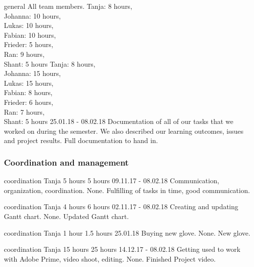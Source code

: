 	{general}%
	{All team members.}%
	{Tanja: 8 hours, \\
	Johanna: 10 hours,\\
	Lukas: 10 hours,\\
	Fabian: 10 hours,\\
	Frieder: 5 hours,\\
	Ran: 9 hours,\\
	Shant: 5 hours}%
	{Tanja: 8 hours,\\ 
	Johanna: 15 hours,\\
	Lukas: 15 hours,\\
	Fabian: 8 hours,\\
	Frieder: 6 hours,\\
	Ran: 7 hours,\\
	Shant: 5 hours}%
	{25.01.18 - 08.02.18}%
	{Documentation of all of our tasks that we worked on during the semester. We also described our learning outcomes, issues and project results.}%
	{}%
	{Full documentation to hand in.}%

\subsubsection{Coordination and management}
	{coordination}%
	{Tanja}%
	{5 hours}%
	{5 hours}%
	{09.11.17 - 08.02.18}%
	{Communication, organization, coordination.}%
	{None.}%
	{Fulfilling of tasks in time, good communication.}%


	{coordination}%
	{Tanja}%
	{4 hours}%
	{6 hours}%
	{02.11.17 - 08.02.18}%
	{Creating and updating Gantt chart.}%
	{None.}%
	{Updated Gantt chart.}%
	
	{coordination}%
	{Tanja}%
	{1 hour}%
	{1.5 hours}%
	{25.01.18}%
	{Buying new glove.}%
	{None.}%
	{New glove.}%

	{coordination}%
	{Tanja}%
	{15 hours}%
	{25 hours}%
	{14.12.17 - 08.02.18}%
	{Getting used to work with Adobe Prime, video shoot, editing.}%
	{None.}%
	{Finished Project video.}%
	
